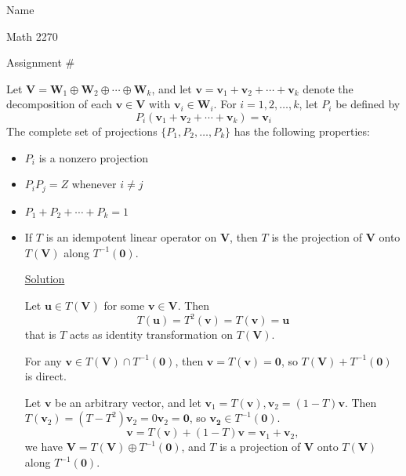 \documentclass[12pt]{article}
\begin{document}
\hfill Name 

\hfill Math 2270

\hfill Assignment \#

Let $\mathbf{V}=\mathbf{W}_1\oplus\mathbf{W}_2\oplus\cdots\oplus\mathbf{W}_k$, and let $\mathbf{v}=\mathbf{v}_1+\mathbf{v}_2+\cdots+\mathbf{v}_k$ denote the decomposition of each $\mathbf{v}\in\mathbf{V}$ with $\mathbf{v}_i\in\mathbf{W}_i$. For $i=1,2,\dots,k$, let $P_i$ be defined by 
\[
P_i(\mathbf{v}_1+\mathbf{v}_2+\cdots+\mathbf{v}_k)=\mathbf{v}_i
\]
The complete set of projections $\{P_1,P_2,\dots,P_k\}$ has the following properties:
\begin{itemize}
\item $P_i$ is a nonzero projection
    \item $P_iP_j=Z$ whenever $i\neq j$
    \item $P_1+P_2+\cdots +P_k=1$
\end{itemize}

\begin{itemize}

\item [1)] If $T$ is an idempotent linear operator on $\mathbf{V}$, then $T$ is the projection of $\mathbf{V}$ onto $T(\mathbf{V})$ along $T^{-1}(\mathbf{0})$.

\underline{Solution}

Let $\mathbf{u}\in T(\mathbf{V})$ for some $\mathbf{v}\in \mathbf{V}$. Then
\[
T(\mathbf{u})=T^2(\mathbf{v})=T(\mathbf{v})=\mathbf{u}
\]
that is $T$ acts as identity transformation on $T(\mathbf{V})$.

For any $\mathbf{v}\in T(\mathbf{V})\cap T^{-1}(\mathbf{0})$, then $\mathbf{v}=T(\mathbf{v})=\mathbf{0}$, so $T(\mathbf{V})+T^{-1}(\mathbf{0})$ is direct.

Let $\mathbf{v}$ be an arbitrary vector, and let $\mathbf{v}_1=T(\mathbf{v}),\mathbf{v}_2=(1-T)\mathbf{v}$. Then $T(\mathbf{v}_2)=(T-T^2)\mathbf{v}_2=0\mathbf{v}_2=\mathbf{0}$, so $\mathbf{v_2}\in T^{-1}(\mathbf{0})$.
\[
\mathbf{v}=T(\mathbf{v})+(1-T)\mathbf{v}=\mathbf{v}_1+\mathbf{v}_2,
\]
we have $\mathbf{V}= T(\mathbf{V})\oplus T^{-1}(\mathbf{0})$, and $T$ is a projection of $\mathbf{V}$ onto $T(\mathbf{V})$ along $T^{-1}(\mathbf{0})$.

\end{itemize}
\end{document}
